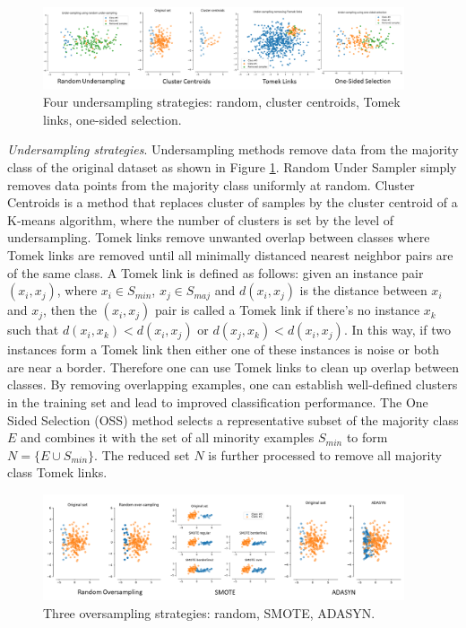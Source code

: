 \begin{figure}[tbhp]
    \centering
    \includegraphics[width=0.95\textwidth, trim={10 10 10 10}]{figures/undersampling.png}
    \caption{Four undersampling strategies: random, cluster centroids, Tomek links, one-sided selection.}
    \label{fig:undersampling}
\end{figure}

\textit{Undersampling strategies}. Undersampling methods remove data from the majority class of the original dataset as shown in Figure \ref{fig:undersampling}. Random Under Sampler simply removes data points from the majority class uniformly at random. Cluster Centroids is a method that replaces cluster of samples by the cluster centroid of a K-means algorithm, where the number of clusters is set by the level of undersampling. Tomek links remove unwanted overlap between classes where Tomek links are removed until all minimally distanced nearest neighbor pairs are of the same class. A Tomek link is defined as follows: given an instance pair $(x_i, x_j)$, where $x_i \in S_{min}$, $x_j \in S_{maj}$ and $d(x_i,x_j)$ is the distance between $x_i$ and $x_j$, then the $(x_i, x_j)$ pair is called a Tomek link if there's no instance $x_k$ such that $d(x_i, x_k) < d(x_i, x_j)$ or $d(x_j, x_k) < d(x_i, x_j)$. In this way, if two instances form a Tomek link then either one of these instances is noise or both are near a border. Therefore one can use Tomek links to clean up overlap between classes. By removing overlapping examples, one can establish well-defined clusters in the training set and lead to improved classification performance. The One Sided Selection (OSS) method selects a representative subset of the majority class $E$ and combines it with the set of all minority examples $S_{min}$ to form $N = \{E\cup S_{min}\}$. The reduced set $N$ is further processed to remove all majority class Tomek links.\\  

\begin{figure}[tbhp]
    \centering
    \includegraphics[width=0.95\textwidth, trim={10 10 10 10}]{figures/oversampling.png}
    \caption{Three oversampling strategies: random, SMOTE, ADASYN.}
    \label{fig:oversampling}
\end{figure}

